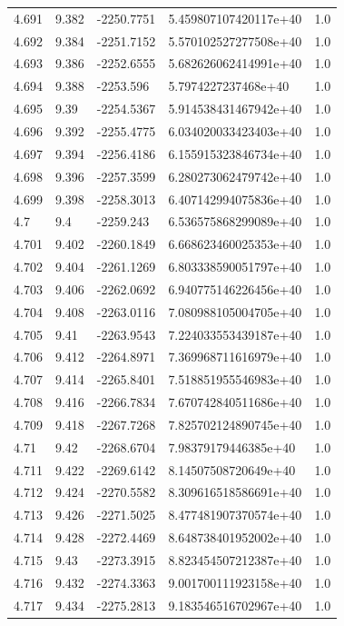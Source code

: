 \begin{tabular}{lllll}
4.691 & 9.382 & -2250.7751 & 5.459807107420117e+40 & 1.0 \\
4.692 & 9.384 & -2251.7152 & 5.570102527277508e+40 & 1.0 \\
4.693 & 9.386 & -2252.6555 & 5.682626062414991e+40 & 1.0 \\
4.694 & 9.388 & -2253.596 & 5.7974227237468e+40 & 1.0 \\
4.695 & 9.39 & -2254.5367 & 5.914538431467942e+40 & 1.0 \\
4.696 & 9.392 & -2255.4775 & 6.034020033423403e+40 & 1.0 \\
4.697 & 9.394 & -2256.4186 & 6.155915323846734e+40 & 1.0 \\
4.698 & 9.396 & -2257.3599 & 6.280273062479742e+40 & 1.0 \\
4.699 & 9.398 & -2258.3013 & 6.407142994075836e+40 & 1.0 \\
4.7 & 9.4 & -2259.243 & 6.536575868299089e+40 & 1.0 \\
4.701 & 9.402 & -2260.1849 & 6.668623460025353e+40 & 1.0 \\
4.702 & 9.404 & -2261.1269 & 6.803338590051797e+40 & 1.0 \\
4.703 & 9.406 & -2262.0692 & 6.940775146226456e+40 & 1.0 \\
4.704 & 9.408 & -2263.0116 & 7.080988105004705e+40 & 1.0 \\
4.705 & 9.41 & -2263.9543 & 7.224033553439187e+40 & 1.0 \\
4.706 & 9.412 & -2264.8971 & 7.369968711616979e+40 & 1.0 \\
4.707 & 9.414 & -2265.8401 & 7.518851955546983e+40 & 1.0 \\
4.708 & 9.416 & -2266.7834 & 7.670742840511686e+40 & 1.0 \\
4.709 & 9.418 & -2267.7268 & 7.825702124890745e+40 & 1.0 \\
4.71 & 9.42 & -2268.6704 & 7.98379179446385e+40 & 1.0 \\
4.711 & 9.422 & -2269.6142 & 8.14507508720649e+40 & 1.0 \\
4.712 & 9.424 & -2270.5582 & 8.309616518586691e+40 & 1.0 \\
4.713 & 9.426 & -2271.5025 & 8.477481907370574e+40 & 1.0 \\
4.714 & 9.428 & -2272.4469 & 8.648738401952002e+40 & 1.0 \\
4.715 & 9.43 & -2273.3915 & 8.823454507212387e+40 & 1.0 \\
4.716 & 9.432 & -2274.3363 & 9.001700111923158e+40 & 1.0 \\
4.717 & 9.434 & -2275.2813 & 9.183546516702967e+40 & 1.0 \\

\end{tabular}

